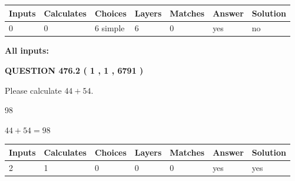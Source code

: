 \documentclass[12pt]{article}
\begin{document}
 
   
   
   
   
\noindent\begin{tabular}{|l|l|l|l|l|l|l|}
 \hline
Inputs & Calculates & Choices & Layers & Matches & Answer & Solution \\ \hline
 0  & 
 0  & 
 6
  simple  
  & 
 6  & 
 0  & 
  yes & 
  no 
  \\ \hline
 \end{tabular}
   
   
   
   
\noindent{}
   
   
   
   
\noindent\vspace{0.1in}\hspace{-0.08in} {\textbf{\Large{All inputs: }}}
   
   
  
\vspace{0.2in}
  
{\textbf{\Large{QUESTION
476.2 
 ( 1 , 1 , 6791 )
}}}
  
  
 
Please calculate $ %
44 +  %
54 $.
 
 
 
\noindent{}
 
 

98
 
 
\noindent{}
 
 

 
 
 
\noindent{}
 
 

$ %
44 +  %
54=   %
98$
 
 
\noindent{}
 
 

 
   
   
   
   
\noindent\begin{tabular}{|l|l|l|l|l|l|l|}
 \hline
Inputs & Calculates & Choices & Layers & Matches & Answer & Solution \\ \hline
 2  & 
 1  & 
 0
  & 
 0  & 
 0  & 
  yes & 
  yes 
  \\ \hline
 \end{tabular}
   
\end{document}
